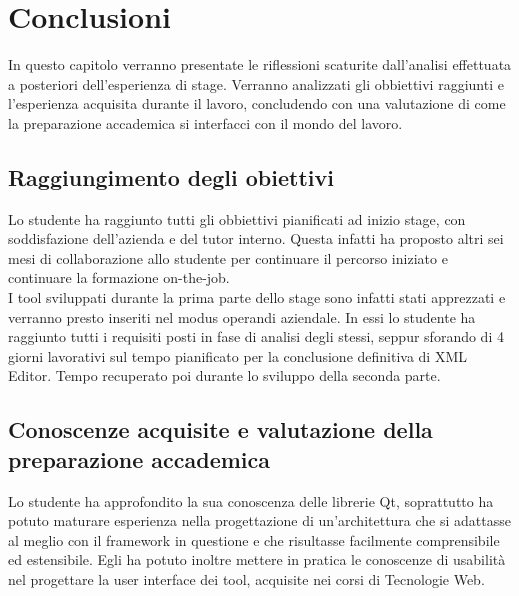 
\chapter{Conclusioni}
\label{cap:conclusioni}

In questo capitolo verranno presentate le riflessioni scaturite dall'analisi effettuata a posteriori dell'esperienza di stage. Verranno analizzati gli obbiettivi raggiunti e l'esperienza acquisita durante il lavoro, concludendo con una valutazione di come la preparazione accademica si interfacci con il mondo del lavoro.

\section{Raggiungimento degli obiettivi}

Lo studente ha raggiunto tutti gli obbiettivi pianificati ad inizio stage, con soddisfazione dell'azienda e del tutor interno. Questa infatti ha proposto altri sei mesi di collaborazione allo studente per continuare il percorso iniziato e continuare la formazione on-the-job.\\

I tool sviluppati durante la prima parte dello stage sono infatti stati apprezzati e verranno presto inseriti nel modus operandi aziendale. In essi lo studente ha raggiunto tutti i requisiti posti in fase di analisi degli stessi, seppur sforando di 4 giorni lavorativi sul tempo pianificato per la conclusione definitiva di XML Editor. Tempo recuperato poi durante lo sviluppo della seconda parte.\\

\section{Conoscenze acquisite e valutazione della preparazione accademica}

Lo studente ha approfondito la sua conoscenza delle librerie Qt\textsuperscript{\textregistered}, soprattutto ha potuto maturare esperienza nella progettazione di un'architettura che si adattasse al meglio con il framework in questione e che risultasse facilmente comprensibile ed estensibile. Egli ha potuto inoltre mettere in pratica le conoscenze di usabilità nel progettare la user interface dei tool, acquisite nei corsi di Tecnologie Web.\\

